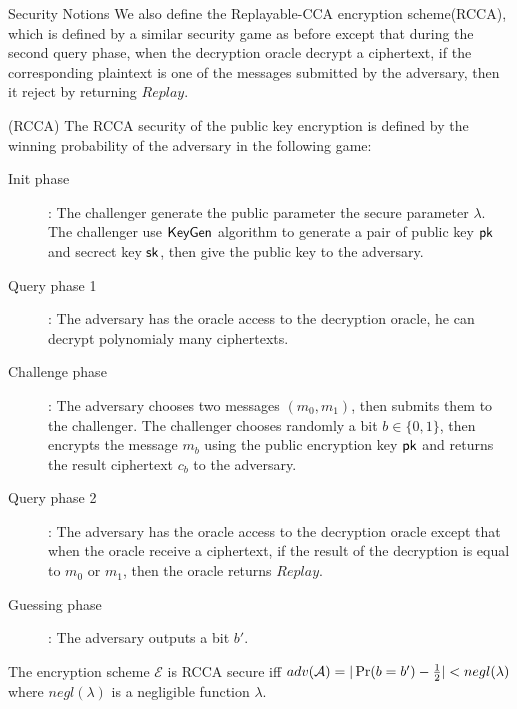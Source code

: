 \begin{subsection}{Security Notions}
  We also define the Replayable-CCA encryption scheme(RCCA), which is defined by a similar security game as before except that during the second query phase, when the decryption oracle decrypt a ciphertext, if the corresponding plaintext is one of the messages submitted by the adversary, then it reject by returning $Replay$.
  \begin{myDef}{(RCCA)}
    The RCCA security of the public key encryption is defined by the winning probability of the adversary in the following game:
    \begin{description}
    \item[Init phase]:
      The challenger generate the public parameter \wrt the secure parameter $\lambda$. The challenger use ${\mathsf{KeyGen}}$ algorithm to generate a pair of public key $\mathsf{pk}$ and secrect key $\mathsf{sk}$, then give the public key to the adversary.
    \item[Query phase 1]: The adversary has the oracle access to the decryption oracle, he can decrypt polynomialy many ciphertexts.
    \item[Challenge phase]: The adversary chooses two messages $(m_0, m_1)$, then submits them to the challenger. The challenger chooses randomly a bit $b \in \{0,1\}$, then encrypts the message $m_b$ using the public encryption key $\mathsf{pk}$ and returns the result ciphertext $c_b$ to the adversary.
    \item[Query phase 2]: The adversary has the oracle access to the decryption oracle except that when the oracle receive a ciphertext, if the result of the decryption is equal to $m_0$ or $m_1$, then the oracle returns $Replay$.
    \item[Guessing phase]: The adversary outputs a bit $b'$.
  \end{description}

  The encryption scheme $\mathcal{E}$ is RCCA secure iff $adv(\mathcal{A}) = |\operatorname{Pr}(b = b') - \frac{1}{2}| < negl(\lambda)$ where $negl(\lambda)$ is a negligible function \wrt $\lambda$.
  \end{myDef}


\end{subsection}
